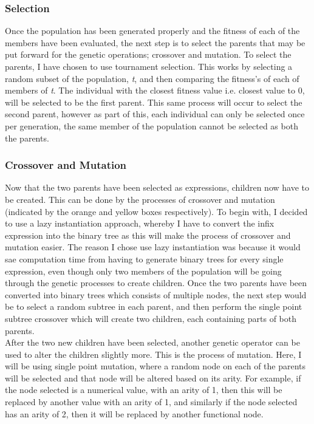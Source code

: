 \documentclass[11pt]{article}
\begin{document}
\subsubsection{Selection}
Once the population has been generated properly and the fitness of each of the members have been evaluated, the next step is to select the parents that may be put forward for the genetic operations; crossover and mutation. To select the parents, I have chosen to use tournament selection. This works by selecting a random subset of the population, \textit{t}, and then comparing the fitness's of each of members of \textit{t}. The individual with the closest fitness value i.e. closest value to 0, will be selected to be the first parent. This same process will occur to select the second parent, however as part of this, each individual can only be selected once per generation, the same member of the population cannot be selected as both the parents. 
\subsubsection{Crossover and Mutation}
Now that the two parents have been selected as expressions, children now have to be created. This can be done by the processes of crossover and mutation (indicated by the orange and yellow boxes respectively). To begin with, I decided to use a lazy instantiation approach, whereby I have to convert the infix expression into the binary tree as this will make the process of crossover and mutation easier. The reason I chose use lazy instantiation was because it would sae computation time from having to generate binary trees for every single expression, even though only two members of the population will be going through the genetic processes to create children. Once the two parents have been converted into binary trees which consists of multiple nodes, the next step would be to select a random subtree in each parent, and then perform the single point subtree crossover which will create two children, each containing parts of both parents. \\
After the two new children have been selected, another genetic operator can be used to alter the children slightly more. This is the process of mutation. Here, I will be using single point mutation, where a random node on each of the parents will be selected and that node will be altered based on its arity. For example, if the node selected is a numerical value, with an arity of 1, then this will be replaced by another value with an arity of 1, and similarly if the node selected has an arity of 2, then it will be replaced by another functional node. 
\end{document}
